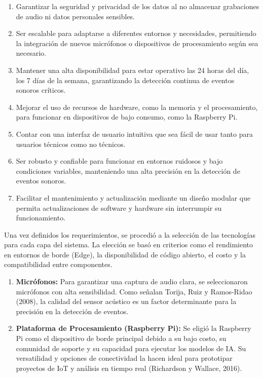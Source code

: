 
\begin{enumerate}
      \item Garantizar la seguridad y privacidad de los datos al no almacenar grabaciones de audio ni datos personales sensibles.
      \item Ser escalable para adaptarse a diferentes entornos y necesidades, permitiendo la integración de nuevos micrófonos o dispositivos de procesamiento según sea necesario.
      \item Mantener una alta disponibilidad para estar operativo las 24 horas del día, los 7 días de la semana, garantizando la detección continua de eventos sonoros críticos.
      \item Mejorar el uso de recursos de hardware, como la memoria y el procesamiento, para funcionar en dispositivos de bajo consumo, como la Raspberry Pi.
      \item Contar con una interfaz de usuario intuitiva que sea fácil de usar tanto para usuarios técnicos como no técnicos.
      \item Ser robusto y confiable para funcionar en entornos ruidosos y bajo condiciones variables, manteniendo una alta precisión en la detección de eventos sonoros.
      \item Facilitar el mantenimiento y actualización mediante un diseño modular que permita actualizaciones de software y hardware sin interrumpir su funcionamiento.
\end{enumerate}


Una vez definidos los requerimientos, se procedió a la selección de las tecnologías para cada capa del sistema. La elección se basó en criterios como el rendimiento en entornos de borde (Edge), la disponibilidad de código abierto, el costo y la compatibilidad entre componentes.


\begin{enumerate}
      \item \textbf{Micrófonos:} Para garantizar una captura de audio clara, se seleccionaron micrófonos con alta sensibilidad. Como señalan Torija, Ruiz y Ramos-Ridao (2008), la calidad del sensor acústico es un factor determinante para la precisión en la detección de eventos.
      \item \textbf{Plataforma de Procesamiento (Raspberry Pi):} Se eligió la Raspberry Pi como el dispositivo de borde principal debido a su bajo costo, su comunidad de soporte y su capacidad para ejecutar los modelos de IA. Su versatilidad y opciones de conectividad la hacen ideal para prototipar proyectos de IoT y análisis en tiempo real (Richardson y Wallace, 2016).
\end{enumerate}

